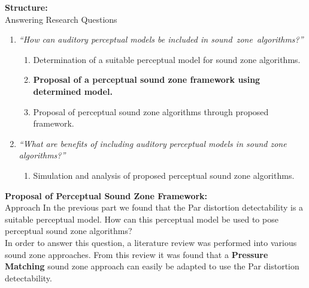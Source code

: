 \documentclass[aspectratio=169]{beamer}
\begin{document}
\begin{frame}{\textbf{Structure:}\\ Answering Research Questions}
    \begin{enumerate}
        \item {\textit{``How can auditory perceptual models be included in sound~zone~algorithms?''}}
            \vspace{7pt}
            \begin{enumerate}
                \item Determination of a suitable perceptual model for sound zone algorithms.
                \vspace{7pt}
                \item \textbf{Proposal of a perceptual sound zone framework using determined model. }
                \vspace{7pt}
                \item Proposal of perceptual sound zone algorithms through proposed framework.
                \vspace{7pt}
            \end{enumerate}
        \item {\textit{``What are benefits of including auditory perceptual models in sound zone algorithms?''}}
            \vspace{-5pt}
            \begin{enumerate}
                \item Simulation and analysis of proposed perceptual sound zone algorithms.
            \end{enumerate}
    \end{enumerate}
\end{frame}

\begin{frame}{\textbf{Proposal of Perceptual Sound Zone Framework:}\\ Approach}
    In the previous part we found that the Par distortion detectability is a suitable perceptual model.
    How can this perceptual model be used to pose perceptual sound zone algorithms?\\
    \vspace{10pt}
    In order to answer this question, a literature review was performed into various sound zone approaches.
    From this review it was found that a \textbf{Pressure Matching} sound zone approach can easily be adapted to 
    use the Par distortion detectability.
\end{frame}
\end{document}

